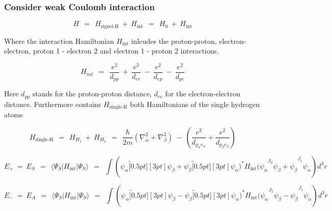 \documentclass[10pt]{report}
\numberwithin{equation}{chapter}
\begin{document}
\subsubsection{Consider weak Coulomb interaction}


\begin{equation}
  H ~~=~~ H_\text{signel-H} ~+~ H_\text{int} ~~=~~ H_0 ~+~ H_\text{int}
\end{equation}

Where the interaction Hamiltonian $H_\text{int}$ inlcudes the proton-proton, electron-electron, proton 1 - electron 2 and electron 1 - proton 2 interactions.

\begin{equation}
  H_{int} ~~=~~ \frac{e^2}{d_{pp}} ~+~ \frac{e^2}{d_{ee}} ~-~ \frac{e^2}{d_{ep}} ~-~ \frac{e^2}{d_{pe}}
\end{equation}

Here $d_{pp}$ stands for the proton-proton distance, $d_{ee}$ for the electron-electron distance.
Furthermore contains $H_\text{single-H}$ both Hamiltonians of the single hydrogen atoms

\begin{equation}
  H_\text{single-H} ~~=~~ H_{H_1} ~+~ H_{H_2} ~~=~~ 
  \frac{\hbar}{2m} \left( \nabla^2_\alpha + \nabla^2_\beta \right) ~-~ 
  \left(\frac{e^2}{d_{p_\alpha e_\alpha}} + \frac{e^2}{d_{p_\beta e_\beta}} \right)
\end{equation}



\begin{equation}
  E_+ ~=~E_S ~~=~~ \langle \Psi_S | H_\text{int} | \Psi_S \rangle ~~=~~
  \int ( \psi_\alpha \overbracket[0.5pt][3pt]{ \psi_\beta + \psi_\beta \overbracket[0.5pt][3pt]{ \psi_\alpha )^* H_\text{int} 
  ( \psi_\alpha }^{J_2} \psi_\beta + \psi_\beta}^{J_1}  \psi_\alpha ) d^3r
\end{equation}



\begin{equation}
  E_- ~=~E_A ~~=~~ \langle \Psi_S | H_\text{int} | \Psi_S \rangle ~~=~~
  \int ( \psi_\alpha \overbracket[0.5pt][3pt]{ \psi_\beta - \psi_\beta \overbracket[0.5pt][3pt]{ \psi_\alpha )^* H_\text{int} 
  ( \psi_\alpha }^{J_2} \psi_\beta - \psi_\beta}^{J_1} \psi_\alpha ) d^3r
\end{equation}
\end{document}
